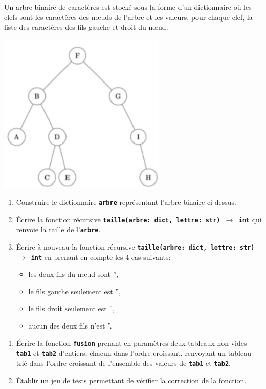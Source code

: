 \documentclass[a4paper,11pt]{article}
\begin{document}
\begin{exo}
    Un arbre binaire de caractères est stocké sous la forme d’un dictionnaire où les clefs sont les caractères des nœuds de l’arbre et les valeurs, pour
    chaque clef, la liste des caractères des fils gauche et droit du nœud.
    \begin{center}
        \centering
        \includegraphics[width=8cm]{ressources/arbre.png}
    \end{center}
    \begin{enumerate}
        \item Construire le dictionnaire \textbf{\texttt{arbre}} représentant l'arbre binaire ci-dessus.
        \item Écrire la fonction récursive \textbf{\texttt{taille(arbre: dict, lettre: str) $\rightarrow$ int}} qui renvoie la taille de l'\texttt{\textbf{arbre}}. 
        \item Écrire à nouveau la fonction récursive \textbf{\texttt{taille(arbre: dict, lettre: str) $\rightarrow$ int}} en prenant en compte les 4 cas suivants: \begin{itemize}
            \item les deux fils du nœud sont '', 
            \item le fils gauche seulement est '', 
            \item le fils droit seulement est '', 
            \item aucun des deux fils n’est ''.
        \end{itemize}
    \end{enumerate}
\end{exo}
\begin{exo}
    \begin{enumerate}
        \item Écrire la fonction \texttt{\textbf{fusion}} prenant en paramètres deux tableaux non vides \texttt{\textbf{tab1}} et \texttt{\textbf{tab2}} d'entiers, chacun dans l’ordre croissant, renvoyant un tableau trié dans l’ordre croissant de l’ensemble des valeurs de \texttt{\textbf{tab1}} et \texttt{\textbf{tab2}}.
        \item Établir un jeu de tests permettant de vérifier la correction de la fonction.
    \end{enumerate}
\end{exo}
\end{document}
